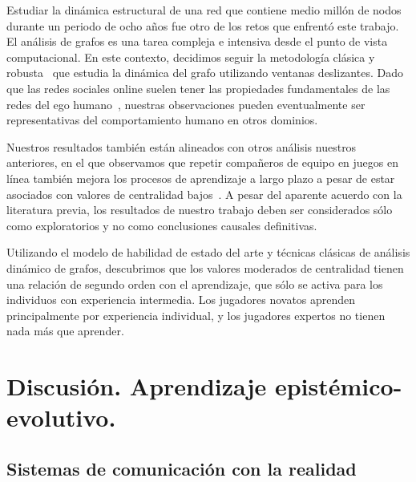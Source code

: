\documentclass[a4paper,11pt]{book}
\theoremstyle{definition}
\begin{document}

Estudiar la din\'amica estructural de una red que contiene medio mill\'on de nodos durante un periodo de ocho a\~nos fue otro de los retos que enfrent\'o este trabajo.
%
El an\'alisis de grafos es una tarea compleja e intensiva desde el punto de vista computacional.
%
En este contexto, decidimos seguir la metodolog\'ia cl\'asica y robusta~\cite{Kossinets2006, Mcgregor2014} que estudia la din\'amica del grafo utilizando ventanas deslizantes.
%
Dado que las redes sociales online suelen tener las propiedades fundamentales de las redes del ego humano~\cite{arnaboldi2017-egoNetwork}, nuestras observaciones pueden eventualmente ser representativas del comportamiento humano en otros dominios.


Nuestros resultados tambi\'en est\'an alineados con otros an\'alisis nuestros anteriores, en el que observamos que repetir compa\~neros de equipo en juegos en l\'inea tambi\'en mejora los procesos de aprendizaje a largo plazo a pesar de estar asociados con valores de centralidad bajos~\cite{Landfried2019}.
%
A pesar del aparente acuerdo con la literatura previa, los resultados de nuestro trabajo deben ser considerados s\'olo como exploratorios y no como conclusiones causales definitivas.

%

Utilizando el modelo de habilidad de estado del arte y t\'ecnicas cl\'asicas de an\'alisis din\'amico de grafos, descubrimos que los valores moderados de centralidad tienen una relaci\'on de segundo orden con el aprendizaje, que s\'olo se activa para los individuos con experiencia intermedia.
Los jugadores novatos aprenden principalmente por experiencia individual, y los jugadores expertos no tienen nada m\'as que aprender.




\chapter{Discusi\'on. Aprendizaje epist\'emico-evolutivo.} \label{ch_epistemico}


\section{Sistemas de comunicaci\'on con la realidad} \label{sec:base_empirica_metodo}
\end{document}
